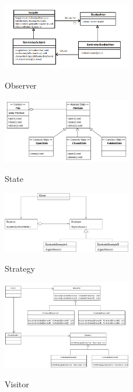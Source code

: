 \begin{figure}[h]
	\begin{center}
		\includegraphics[width=0.5\textwidth]{images/observer}
		\label{fig:observer}
		\caption{Observer}
	\end{center}
\end{figure}

\begin{figure}[h]
	\begin{center}
		\includegraphics[width=0.5\textwidth]{images/state}
		\label{fig:state}
		\caption{State}
	\end{center}
\end{figure}

\begin{figure}[h]
	\begin{center}
		\includegraphics[width=0.5\textwidth]{images/strategy}
		\label{fig:strategy}
		\caption{Strategy}
	\end{center}
\end{figure}

\begin{figure}[h]
	\begin{center}
		\includegraphics[width=0.5\textwidth]{images/visitor}
		\label{fig:visitor}
		\caption{Visitor}
	\end{center}
\end{figure}
